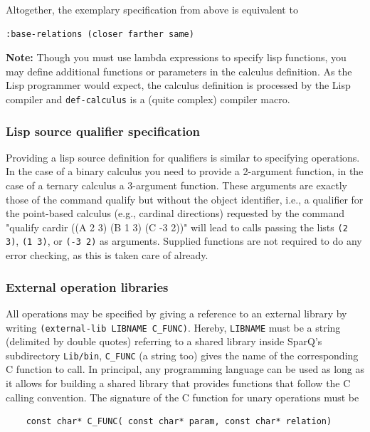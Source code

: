 \documentclass[headsepline]{scrreprt}
\theoremstyle{definition}
\newcommand{\engine}{SparQ}
\begin{document}
Altogether, the exemplary specification from above is equivalent to

\begin{verbatim}
:base-relations (closer farther same)
\end{verbatim}

{\bf Note:} Though you must use lambda expressions to specify lisp functions, you may define additional functions or parameters in the calculus definition. As the Lisp programmer would expect, the calculus definition is processed by the Lisp compiler and {\tt def-calculus} is a (quite complex) compiler macro.

\subsubsection{Lisp source qualifier specification}

Providing a lisp source definition for qualifiers is similar to specifying operations. In the case of a binary calculus you need to provide a 2-argument function, in the case of a ternary calculus a 3-argument function. These arguments are exactly those of the command qualify but without the object identifier, i.e., a qualifier for the point-based calculus (e.g., cardinal directions) requested by the command "qualify cardir ((A 2 3)  (B 1 3) (C -3 2))" will lead to calls passing the lists {\tt (2 3)}, {\tt (1 3)}, or {\tt (-3 2)} as arguments. Supplied functions are not required to do any error checking, as this is taken care of already.


\subsubsection{External operation libraries}

All operations may be specified by giving a reference to an external library by writing \verb=(external-lib LIBNAME C_FUNC)=. Hereby, \verb=LIBNAME= must be a string (delimited by double quotes) referring to a shared library inside \engine{}'s subdirectory {\tt Lib/bin}, \verb=C_FUNC= (a string too) gives the name of the corresponding C function to call. In principal, any programming language can be used as long as it allows for building a shared library that provides functions that follow the C calling convention. The signature of the C function for unary operations must be

\begin{verbatim}
	const char* C_FUNC( const char* param, const char* relation)
\end{verbatim}
\end{document}
